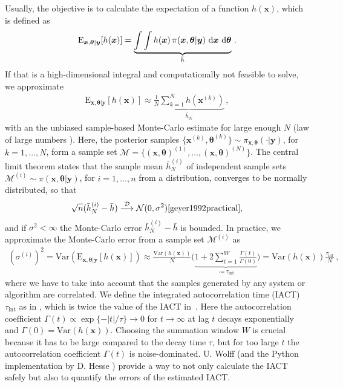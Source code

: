 Usually, the objective is to calculate the expectation of a function $h(\bm{x})$, which is defined as
\begin{align}
	\text{E}_{\bm{x},\bm{\theta}|\bm{y}} [h(\bm{x})] =  \underbrace{\int \int   h(\bm{x}) \,  \pi(\bm{x}, \bm{\theta} | \bm{y} ) \, \mathop{}\!\mathrm{d} \bm{x}  \, \mathop{}\!\mathrm{d} \bm{\theta}}_{\bar{h}}   \label{eq:expPos} \, .
\end{align}
If that is a high-dimensional integral and computationally not feasible to solve, we approximate 
\begin{align}
	\label{eq:sampMean}
	\text{E}_{\bm{x},\bm{\theta}|\bm{y}} [h(\bm{x})] \approx \underbrace{ \frac{1}{N} \sum_{k=1}^{N} h(\bm{x}^{(k)})  }_{\bar{h}_N} \, ,
\end{align}
with an the unbiased sample-based Monte-Carlo estimate \cite{roberts2004general} for large enough $N$ (law of large numbers \cite[Chapter 17]{tweedie2009measprob}).
Here, the posterior samples $\{\bm{x}^{(k)},\bm{\theta}^{(k)} \}\sim \pi_{\bm{x}, \bm{\theta}}(\cdot|\bm{y})$, for $k = 1, \dots, N$, form a sample set $\mathcal{M} =\{ (\bm{x},\bm{\theta})^{(1)}, \dots ,  (\bm{x},\bm{\theta})^{(N)} \}$.
The central limit theorem states that the sample mean $\bar{h}^{(i)}_N $ of independent sample sets $\mathcal{M}^{(i)}\sim\pi (\bm{x}, \bm{\theta}| \bm{y})$, for $i = 1, \dots, n$ from a distribution, converges to be normally distributed, so that
\begin{align}
	\sqrt{n} (\bar{h}^{(i)}_N -  \bar{h} ) \overset{\mathcal{D}}{\longrightarrow} \mathcal{N} (0,\sigma^2) \text{\cite{geyer1992practical}},
\end{align}
and if $\sigma^2 < \infty$ the Monte-Carlo error $\bar{h}^{(i)}_N -  \bar{h} $ is bounded.
In practice, we approximate the Monte-Carlo error from a sample set $\mathcal{M}^{(i)}$ as
\begin{align}
	(\sigma^{(i)})^2  =  \text{Var}(\text{E}_{\bm{x},\bm{\theta}|\bm{y}} [h(\bm{x})]) 
	\approx \frac{\text{Var}(h(\bm{x}) )}{N} \Bigg( \underbrace{  1 + 2 \sum_{t = 1}^{W} \frac{\Gamma(t)}{\Gamma(0)}  }_{ \coloneqq 	\tau_{\text{int}} }\Bigg) = \text{Var}(h(\bm{x})) \frac{ \tau_{\text{int}} }{N} \, , \label{eq:MCerr}
\end{align}
where we have to take into account that the samples generated by any system or algorithm are correlated.
We define the integrated autocorrelation time (IACT) $\tau_{\text{int}}$ as in \cite{fox2016fast}, which is twice the value of the IACT in~\cite[pp. 103-105]{wolff2002LecNot}.
Here the autocorrelation coefficient $\Gamma(t) \propto \exp\{ - |t| /\tau \} \longrightarrow 0$ for $t \rightarrow \infty$ at lag $t$ decays exponentially and $\Gamma(0) =\text{Var}(h(\bm{x}) ) $.
Choosing the summation window $W$ is crucial because it has to be large compared to the decay time $\tau$, but for too large $t$ the autocorrelation coefficient $\Gamma(t)$ is noise-dominated.
U. Wolff \cite{wolff2004monte} (and the Python implementation by D. Hesse \cite{drikHesse}) provide a way to not only calculate the IACT safely but also to quantify the errors of the estimated IACT.

